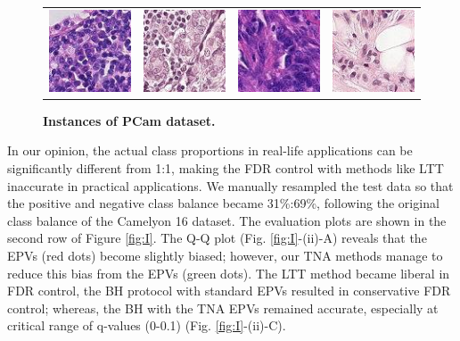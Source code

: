 \documentclass{article}
\begin{document}
\begin{figure}[h!]
	\centering
	\begin{tabular}{cccc}
		\includegraphics[width=1.in]{img/pcam1.jpg} &
		\includegraphics[width=1.in]{img/pcam2.jpg} & 
		\includegraphics[width=1.in]{img/pcam3.jpg} &
		\includegraphics[width=1.in]{img/pcam4.jpg}
	\end{tabular}
	\caption{{\bf Instances of PCam dataset.}}
	\label{fig:pcam_example}
\end{figure} 
 
In our opinion, the actual class proportions in real-life applications can be significantly different from 1:1, making the FDR control with methods like LTT inaccurate in practical applications. We manually resampled the test data so that  the positive and negative class balance became 31\%:69\%, following the original class balance of the Camelyon 16 dataset. The evaluation plots are shown in the second row of Figure \ref{fig:I}. The Q-Q plot (Fig. \ref{fig:I}-(ii)-A) reveals that the EPVs (red dots) become slightly biased; however, our TNA methods manage to reduce this bias from the EPVs (green dots). The LTT method became liberal in FDR control, the BH protocol with standard EPVs resulted in conservative FDR control; whereas, the BH with the TNA EPVs remained accurate, especially at critical range of q-values (0-0.1) (Fig. \ref{fig:I}-(ii)-C).
\end{document}
